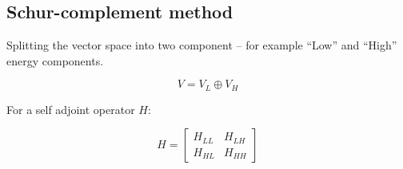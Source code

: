 \documentclass{article}
\theoremstyle{definition}
\begin{document}

\subsection{Schur-complement method}

Splitting the vector space into two component -- for example ``Low'' and ``High'' energy components.

\begin{equation}
    V=V_L \oplus V_H
\end{equation}

For a self adjoint operator $H$:

\begin{equation}
    H=
    \begin{bmatrix}
    H_{LL} & H_{LH} \\
    H_{HL} & H_{HH}
    \end{bmatrix}
\end{equation}
\end{document}

